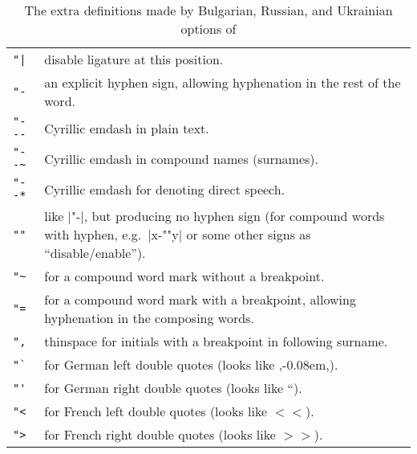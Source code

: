 \begin{table}[htb]
  \begin{center}
  \caption[Bulgarian, Russian, and Ukrainian]{The extra definitions made
           by Bulgarian, Russian, and Ukrainian options of }\label{Cyrillic}
  \begin{tabular}{@{}p{.1\hsize}@{}p{.9\hsize}@{}}
   \hline
   \verb="|= & disable ligature at this position.               \\
   \verb|"-| & an explicit hyphen sign, allowing hyphenation
               in the rest of the word.                         \\
   \verb|"---| & Cyrillic emdash in plain text.                      \\
   \verb|"--~| & Cyrillic emdash in compound names (surnames).       \\
   \verb|"--*| & Cyrillic emdash for denoting direct speech.         \\
   \verb|""| & like |"-|, but producing no hyphen sign
               (for compound words with hyphen, e.g.\ |x-""y|
               or some other signs  as ``disable/enable'').     \\
   \verb|"~| & for a compound word mark without a breakpoint.        \\
   \verb|"=| & for a compound word mark with a breakpoint, allowing
          hyphenation in the composing words.                   \\
   \verb|",| & thinspace for initials with a breakpoint
           in following surname.                                \\
   \verb|"`| & for German left double quotes
               (looks like ,\kern-0.08em,).                     \\
   \verb|"'| & for German right double quotes (looks like ``).       \\%
   \verb|"<| & for French left double quotes (looks like $<\!\!<$).  \\
   \verb|">| & for French right double quotes (looks like $>\!\!>$). \\
   \hline
  \end{tabular}
  \end{center}
\end{table}


